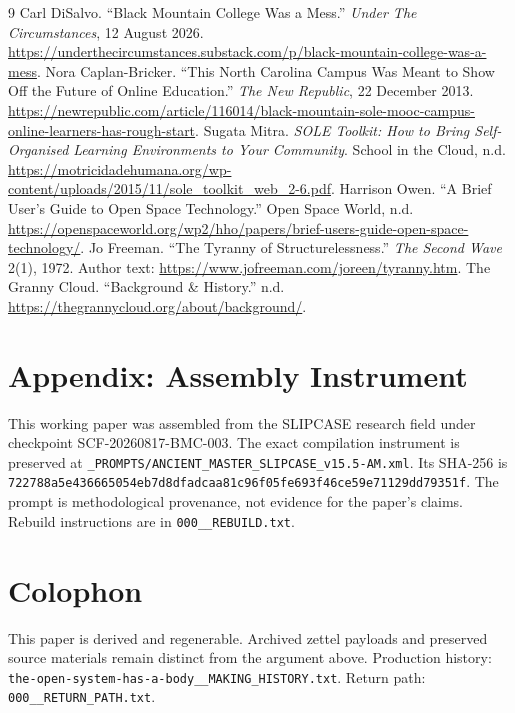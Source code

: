 \documentclass[11pt]{article}
\begin{document}
\begin{thebibliography}{9}
 Carl DiSalvo. ``Black Mountain College Was a Mess.'' \emph{Under The Circumstances}, 12 August 2026. \url{https://underthecircumstances.substack.com/p/black-mountain-college-was-a-mess}.
 Nora Caplan-Bricker. ``This North Carolina Campus Was Meant to Show Off the Future of Online Education.'' \emph{The New Republic}, 22 December 2013. \url{https://newrepublic.com/article/116014/black-mountain-sole-mooc-campus-online-learners-has-rough-start}.
 Sugata Mitra. \emph{SOLE Toolkit: How to Bring Self-Organised Learning Environments to Your Community}. School in the Cloud, n.d. \url{https://motricidadehumana.org/wp-content/uploads/2015/11/sole_toolkit_web_2-6.pdf}.
 Harrison Owen. ``A Brief User's Guide to Open Space Technology.'' Open Space World, n.d. \url{https://openspaceworld.org/wp2/hho/papers/brief-users-guide-open-space-technology/}.
 Jo Freeman. ``The Tyranny of Structurelessness.'' \emph{The Second Wave} 2(1), 1972. Author text: \url{https://www.jofreeman.com/joreen/tyranny.htm}.
 The Granny Cloud. ``Background \& History.'' n.d. \url{https://thegrannycloud.org/about/background/}.
\end{thebibliography}

\section*{Appendix: Assembly Instrument}
This working paper was assembled from the SLIPCASE research field under checkpoint SCF-20260817-BMC-003. The exact compilation instrument is preserved at \nolinkurl{_PROMPTS/ANCIENT_MASTER_SLIPCASE_v15.5-AM.xml}. Its SHA-256 is\\ \nolinkurl{722788a5e436665054eb7d8dfadcaa81c96f05fe693f46ce59e71129dd79351f}. The prompt is methodological provenance, not evidence for the paper's claims. Rebuild instructions are in \nolinkurl{000__REBUILD.txt}.

\section*{Colophon}
This paper is derived and regenerable. Archived zettel payloads and preserved source materials remain distinct from the argument above. Production history: \nolinkurl{the-open-system-has-a-body__MAKING_HISTORY.txt}. Return path: \nolinkurl{000__RETURN_PATH.txt}.

\begin{flushright}
\end{flushright}
\end{document}
